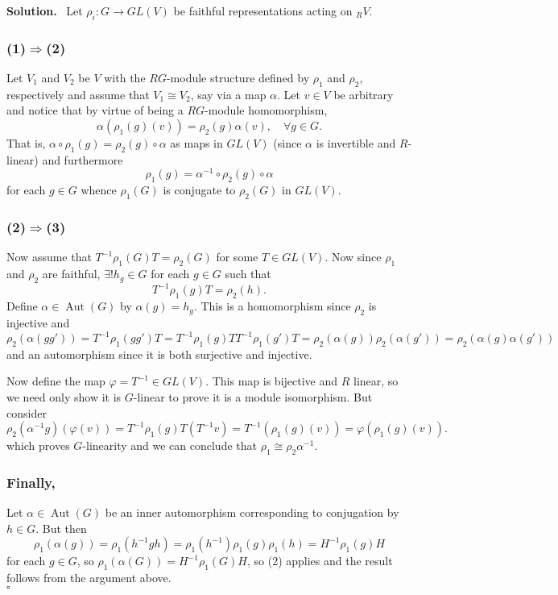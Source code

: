 \documentclass[12pt]{article}
\DeclareMathOperator{\Aut}{Aut}
\newenvironment{sol}{\noindent \textbf{Solution.} \,}{\\\hspace*{\fill}$\square$\medskip}
\begin{document}
\begin{sol}
	Let $\rho_i:G\to GL(V)$ be faithful representations acting on $_RV$.
	\subsubsection*{(1)$\Rightarrow$(2)}
	Let $V_1$ and $V_2$ be $V$ with the $RG$-module structure defined by $\rho_1$ and $\rho_2$, respectively and assume that $V_1\cong V_2$, say via a map $\alpha$. Let $v\in V$ be arbitrary and notice that by virtue of being a $RG$-module homomorphism,
	\[\alpha(\rho_1(g)(v))=\rho_2(g)\alpha(v),\quad\forall g\in G.\]
	That is, $\alpha\circ \rho_1(g)=\rho_2(g)\circ\alpha$ as maps in $GL(V)$ (since $\alpha$ is invertible and $R$-linear) and furthermore
	\[\rho_1(g)=\alpha^{-1}\circ\rho_2(g)\circ\alpha\]
	for each $g\in G$ whence $\rho_1(G)$ is conjugate to $\rho_2(G)$ in $GL(V)$.
	\subsubsection*{(2)$\Rightarrow$(3)}
	Now assume that $T^{-1}\rho_1(G)T=\rho_2(G)$ for some $T\in GL(V)$. Now since $\rho_1$ and $\rho_2$ are faithful, $\exists! h_g\in G$ for each $g\in G$ such that
	\[T^{-1}\rho_1(g)T=\rho_2(h).\]
	Define $\alpha\in\Aut(G)$ by $\alpha(g)=h_g$. This is a homomorphism since $\rho_2$ is injective and
	\[\rho_2(\alpha(gg'))=T^{-1}\rho_1(gg')T=T^{-1}\rho_1(g)TT^{-1}\rho_1(g')T=\rho_2(\alpha(g))\rho_2(\alpha(g'))=\rho_2(\alpha(g)\alpha(g'))\]
	and an automorphism since it is both surjective and injective.
	
	Now define the map $\varphi=T^{-1}\in GL(V)$. This map is bijective and $R$ linear, so we need only show it is $G$-linear to prove it is a module isomorphism. But consider
	\[\rho_2(\alpha^{-1}g)(\varphi(v))=T^{-1}\rho_1(g)T(T^{-1}v)=T^{-1}(\rho_1(g)(v))=\varphi(\rho_1(g)(v)).\]
	which proves $G$-linearity and we can conclude that $\rho_1\cong \rho_2\alpha^{-1}$.
	\subsubsection*{Finally,}
	Let $\alpha\in \Aut(G)$ be an inner automorphism corresponding to conjugation by $h\in G$. But then 
	\[\rho_1(\alpha(g))=\rho_1(h^{-1}gh)=\rho_1(h^{-1})\rho_1(g)\rho_1(h)=H^{-1}\rho_1(g)H\]
	for each $g\in G$, so $\rho_1(\alpha(G))=H^{-1}\rho_1(G)H$, so (2) applies and the result follows from the argument above.
\end{sol}
\end{document}
